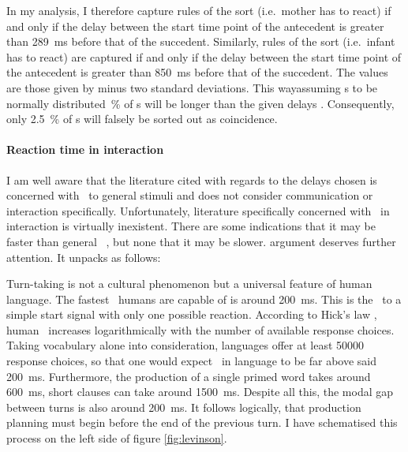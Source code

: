In my analysis, I therefore capture rules of the sort  (i.e.~mother has to react) if and only if the delay between the start time point of the antecedent is greater than 289~ms before that of the succedent.
Similarly, rules of the sort  (i.e.~infant has to react) are captured if and only if the delay between the start time point of the antecedent is greater than 850~ms before that of the succedent.
The values are those given by \citet{leibold02} minus two standard deviations.
This way\dash assuming \rt s to be normally distributed~\% of \rt s will be longer than the given delays \citep[]{moore16}.
Consequently, only 2.5~\% of \rt s will falsely be sorted out as coincidence.

\paragraph{Reaction time in interaction}
I am well aware that the literature cited with regards to the delays chosen is concerned with \rt\ to general stimuli and does not consider communication or interaction specifically.
Unfortunately, literature specifically concerned with \rt\ in interaction is virtually inexistent.
There are some indications that it may be faster than general \rt\ \citep{levinson16}, but none that it may be slower.
 argument deserves further attention.
It unpacks as follows:

Turn-taking is not a cultural phenomenon but a universal feature of human language.
The fastest \rt\ humans are capable of is around 200~ms.
This is the \rt\ to a simple start signal with only one possible reaction.
According to Hick's law \citep{hick52}, human \rt\ increases logarithmically with the number of available response choices.
Taking vocabulary alone into consideration, languages offer at least 50000 response choices, so that one would expect \rt\ in language to be far above said 200~ms.
Furthermore, the production of a single primed word takes around 600~ms, short clauses can take around 1500~ms.
Despite all this, the modal gap between turns is also around 200~ms.
It follows logically, that production planning must begin before the end of the previous turn.
I have schematised this process on the left side of figure \ref{fig:levinson}.

